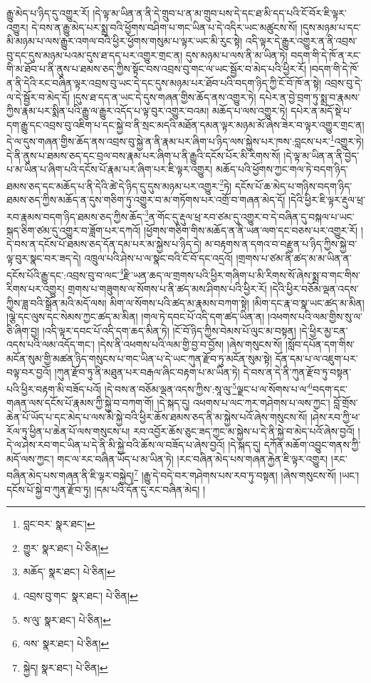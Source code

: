 རྒྱུ་མེད་པ་ཉིད་དུ་འགྱུར་རོ། །དེ་ལྟ་མ་ཡིན་ན་ནི་དེ་གྲུབ་པ་ན་མ་གྲུབ་པས་དེ་དང་ཐ་མི་དད་པའི་ངོ་བོར་ཇི་ལྟར་འགྱུར། དེ་བས་ན་རྒྱུ་མེད་པར་སྨྲ་བའི་ཕྱོགས་བཤིག་པ་གང་ཡིན་པ་དེ་འདིར་ཡང་མཚུངས་སོ། །དུས་མཉམ་པ་དང་མི་མཉམ་པ་ལས་རྒྱུར་འགལ་བའི་ཕྱིར་ཕྱོགས་གསུམ་པ་ལྟར་ཡང་མི་རུང་སྟེ། འདི་ལྟར་དེ་རྒྱུར་འགྱུར་ན་ནི་འབྲས་བུ་དང་དུས་མཉམ་པའམ་དུས་ཐ་དད་པར་འགྱུར་གྲང་ན། དུས་མཉམ་པ་ལས་ནི་མ་ཡིན་ཏེ། བདག་གི་དེ་ཁོ་ན་རང་གི་མ་ཐོབ་པ་ནི་ནུས་པ་ཐམས་ཅད་ཀྱིས་སྟོང་བས་འབྲས་བུ་གང་ལ་ཡང་སྦྱོར་བ་མེད་པའི་ཕྱིར་རོ། །བདག་གི་དེ་ཁོ་ན་ནི་དེའི་རང་བཞིན་ལྟར་འབྲས་བུ་ཡང་དེ་དང་དུས་མཉམ་པར་ཐོབ་པའི་བདག་ཉིད་ཀྱི་ངོ་བོ་ཁོ་ན་སྟེ། འབྲས་བུ་དེ་ལ་དེ་སྦྱོར་བ་མེད་དོ། །དུས་ཐ་དད་ན་ཡང་དེ་དུས་གཞན་གྱིས་ཆོད་ནས་འགྱུར་ཏེ། དཔེར་ན་བྱེ་བྲག་ཏུ་སྨྲ་བ་རྣམས་ཀྱིས་རྣམ་པར་སྨིན་པའི་རྒྱུ་ལ་རྒྱུར་འདོད་པ་ལྟ་བུར་འགྱུར་བའམ། མཆོད་པ་ལས་འགྱུར་ཏེ། དཔེར་ན་མདོ་སྡེ་པ་དག་རྒྱུ་དང་འབྲས་བུ་འཇིག་པ་དང་སྐྱེ་བ་ནི་སྲང་མདའི་མཐོན་དམན་ལྟར་མཉམ་མོ་ཞེས་ཟེར་བ་ལྟར་འགྱུར་གྲང་ན། དེ་ལ་དུས་གཞན་གྱིས་ཆོད་ནས་འབྲས་བུ་སྐྱེ་ན་ནི་རྣམ་པར་ཞིག་པ་ཉིད་ལས་སྐྱེས་པར་ཁས་:བླངས་པར་\footnote{བླང་བར་  སྣར་ཐང་། }འགྱུར་ཏེ། དེ་ནི་ནུས་པ་ཐམས་ཅད་དང་བྲལ་བས་རྣམ་པར་ཞིག་པ་ནི་རྒྱུའི་དངོས་པོར་མི་རིགས་སོ། །དེ་ལྟ་མ་ཡིན་ན་ནི་བྱེད་པ་མ་ཡིན་པ་ཞིག་པའི་དངོས་པོ་རྣམ་པར་ཞིག་པར་ཇི་ལྟར་འགྱུར། མཆོད་པའི་ཕྱོགས་ཀྱང་གལ་ཏེ་བདག་ཉིད་ཐམས་ཅད་དང་མཆོད་པ་ནི་དེའི་ཚེ་དེ་ཉིད་དུ་དུས་མཉམ་པར་འགྱུར་\footnote{གྱུར་  སྣར་ཐང་།  པེ་ཅིན། }ཏེ། དངོས་པོ་ཆ་མེད་པ་གཉིས་བདག་ཉིད་ཐམས་ཅད་ཀྱིས་མཆོད་ན་དུས་གཅིག་ཏུ་འགྱུར་བ་མ་གཏོགས་པར་འགྲོ་བ་གཞན་མེད་དོ། །དེའི་ཕྱིར་ཇི་ལྟར་རྡུལ་ཕྲ་རབ་རྣམས་བདག་ཉིད་ཐམས་ཅད་ཀྱིས་ཆོད་\footnote{མཆོད་  སྣར་ཐང་།  པེ་ཅིན། }ན་གོང་དུ་རྡུལ་ཕྲ་རབ་ཙམ་དུ་འགྱུར་བ་དེ་བཞིན་དུ་བསྐལ་པ་ཡང་སྐད་ཅིག་ཙམ་དུ་འགྱུར་བ་ཟློག་པར་དཀའོ། །ཕྱོགས་གཅིག་གིས་མཆོད་ན་ནི་ཡན་ལག་དང་བཅས་པར་འགྱུར་རོ། །དེ་བས་ན་དངོས་པོ་ཐམས་ཅད་དོན་དམ་པར་མ་སྐྱེས་པ་ཉིད་དེ། མ་བརྟགས་ན་དགའ་བ་བརྫུན་པ་ཉིད་ཀྱིས་སྐྱེ་བ་ལྟ་བུར་སྣང་བར་ཟད་དེ། འཁྲུལ་པའི་ཤེས་པ་ལ་སྣང་བའི་ངོ་བོ་དང་འདྲའོ། །གྲགས་པ་ཙམ་ནི་ཚད་མ་མ་ཡིན་ན་དངོས་པོའི་རྒྱུ་དང་:འབྲས་བུ་བ་ལང་\footnote{འབྲས་བུ་གང་  སྣར་ཐང་།  པེ་ཅིན། }རྫི་ཡན་ཆད་ལ་གྲགས་པའི་ཕྱིར་གཞིག་པ་མི་རིགས་སོ་ཞེས་སྨྲ་བ་གང་གིས་རིགས་པར་འགྱུར། གྲགས་པ་གཟུགས་ལ་སོགས་པ་ནི་ཚད་མས་ཤིགས་པའི་ཕྱིར་རོ། །དེའི་ཕྱིར་བཅོམ་ལྡན་འདས་ཀྱིས་ཟླ་བའི་སྒྲོན་མའི་མདོ་ལས། མིག་ལ་སོགས་པའི་ཚད་མ་རྣམས་བཀག་སྟེ། །མིག་དང་རྣ་བ་སྣ་ཡང་ཚད་མ་མིན། །ལྕེ་དང་ལུས་དང་སེམས་ཀྱང་ཚད་མ་མིན། །གལ་ཏེ་དབང་པོ་འདི་དག་ཚད་ཡིན་ན། །འཕགས་པའི་ལམ་གྱིས་སུ་ལ་ཅི་ཞིག་བྱ། །འདི་ལྟར་དབང་པོ་འདི་དག་ཆད་མིན་ཏེ། །ངོ་བོ་ཉིད་ཀྱིས་བེམས་པོ་ལུང་མ་བསྟན། །དེ་ཕྱིར་མྱ་ངན་འདས་པའི་ལམ་འདོད་གང་། །དེས་ནི་འཕགས་པའི་ལམ་གྱི་བྱ་བ་བྱོས། །ཞེས་གསུངས་སོ། །སློབ་དཔོན་དག་གིས་མངོན་སུམ་གྱི་མཚན་ཉིད་གསུངས་པ་གང་ཡིན་པ་དེ་ཡང་ཀུན་རྫོབ་ཏུ་མངོན་སུམ་སྟེ། དོན་དམ་པ་ལ་འཇུག་པར་བལྟ་བར་བྱའོ། །ཀུན་རྫོབ་ཏུ་ནི་མཐུན་པར་བརྒལ་ཞིང་བརྟག་པ་མ་ཡིན་ཏེ། དེ་བས་ན་དེ་ནི་ཀུན་རྫོབ་ཏུ་བསྟན་པའི་ཕྱིར་བརྟག་མི་བཟོད་པའོ། །དེ་བས་ན་བཅོམ་ལྡན་འདས་ཀྱིས་:སཱ་ལུ་\footnote{ས་ལུ་  སྣར་ཐང་།  པེ་ཅིན། }ལྗང་པ་ལ་སོགས་པ་ལ་\footnote{ལས་  སྣར་ཐང་།  པེ་ཅིན། }བདག་དང་གཞན་ལས་དངོས་པོ་རྣམས་ཀྱི་སྐྱེ་བ་བཀག་གོ། །དེ་སྐད་དུ། འཕགས་པ་ལང་ཀར་གཤེགས་པ་ལས་ཀྱང་། བློ་གྲོས་ཆེན་པོ་ཡོད་པ་དང་མེད་པ་ལས་མི་སྐྱེ་བའི་ཕྱིར་ཆོས་ཐམས་ཅད་ནི་མ་སྐྱེས་པའོ་ཞེས་གསུངས་སོ། །ཤེས་རབ་ཀྱི་ཕ་རོལ་ཏུ་ཕྱིན་པ་ཆེན་པོ་ལས་གསུངས་པ། རབ་འབྱོར་ཆོས་ཅུང་ཟད་ཀྱང་མ་སྐྱེས་པ་དེ་ནི་སྐྱེ་བ་མེད་པའོ་ཞེས་བྱའོ། །དེ་ལ་ཤེས་རབ་གང་ཡིན་པ་དེ་ནི་མི་སྐྱེ་བའི་ཆོས་ལ་བཟོད་པ་ཞེས་བྱའོ། །དེ་སྐད་དུ། དཀོན་མཆོག་འབྱུང་གནས་ཀྱི་མདོ་ལས་ཀྱང་། གང་ལ་རང་བཞིན་ཡོད་པ་མ་ཡིན་ཏེ། །རང་བཞིན་མེད་པས་གཞན་རྐྱེན་ཇི་ལྟར་འགྱུར། །རང་བཞིན་མེད་པས་གཞན་ནི་ཇི་ལྟར་བསྐྱེད།\footnote{སྐྱེད།  སྣར་ཐང་།  པེ་ཅིན། } །རྒྱུ་དེ་བདེ་བར་གཤེགས་པས་རབ་ཏུ་བསྟན། །ཞེས་གསུངས་སོ། །ཡང་། དངོས་པོ་སྐྱེ་བ་ཀུན་རྫོབ་ཏུ། །དམ་པའི་དོན་དུ་རང་བཞིན་མེད། །
